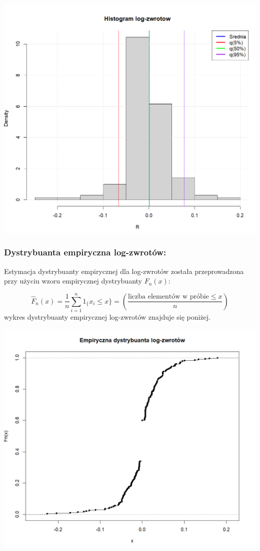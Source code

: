 \documentclass[a4paper,11pt]{article}
\begin{document}
\centerline{\includegraphics[width=14cm]{./Janek/histogram logzwrotow.png}}

\subsubsection{Dystrybuanta empiryczna log-zwrotów:}

Estymacja dystrybuanty empirycznej dla log-zwrotów została przeprowadzona przy użyciu wzoru empirycznej dystrybuanty $F_n(x)$:

$$\hat{F}_n(x) = \frac{1}{n} \sum_{i=1}^{n} 1_\{x_i \leq x\} = \left(\frac{\text{liczba  elementów  w  próbie} \leq x}{n}\right)$$
wykres dystrybuanty empirycznej log-zwrotów znajduje się poniżej.

\centerline{\includegraphics[width=14cm]{./Janek/empiryczna dystrybuanta.png}} 
\end{document}
